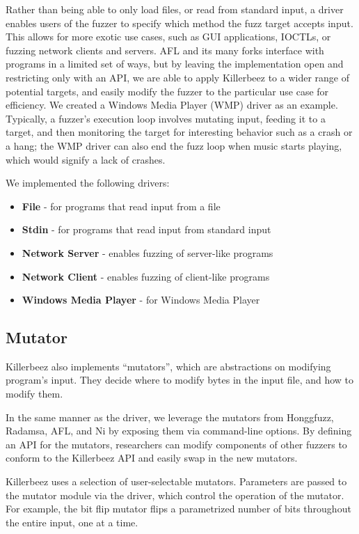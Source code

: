 Rather than being able to only load files, or read from standard input, a
driver enables users of the fuzzer to specify which method the fuzz target
accepts input. This allows for more exotic use cases, such as GUI applications,
IOCTLs, or fuzzing network clients and servers. AFL and its many forks
interface with programs in a limited set of ways, but by leaving the
implementation open and restricting only with an API, we are able to apply
Killerbeez to a wider range of potential targets, and easily modify the fuzzer
to the particular use case for efficiency. We created a Windows Media Player
(WMP) driver as an example.  Typically, a fuzzer's execution loop involves
mutating input, feeding it to a target, and then monitoring the target for
interesting behavior such as a crash or a hang; the WMP driver can also end the
fuzz loop when music starts playing, which would signify a lack of crashes.

We implemented the following drivers:
\begin{itemize}[noitemsep]
\item \textbf{File} - for programs that read input from a file
\item \textbf{Stdin} - for programs that read input from standard input
\item \textbf{Network Server} - enables fuzzing of server-like programs
\item \textbf{Network Client} - enables fuzzing of client-like programs
\item \textbf{Windows Media Player} - for Windows Media Player
\end{itemize}

\subsection{Mutator}
Killerbeez also implements ``mutators'', which are abstractions on modifying
program's input. They decide where to modify bytes in the input file, and how
to modify them.

In the same manner as the driver, we leverage the mutators from Honggfuzz,
Radamsa, AFL, and Ni by exposing them via command-line options. By defining an
API for the mutators, researchers can modify components of other fuzzers to
conform to the Killerbeez API and easily swap in the new mutators. 

Killerbeez uses a selection of user-selectable mutators. Parameters are passed
to the mutator module via the driver, which control the operation of the
mutator. For example, the bit flip mutator flips a parametrized number of bits
throughout the entire input, one at a time.

